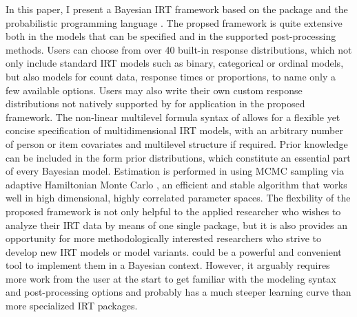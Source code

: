 \documentclass[jss]{jss}
\begin{document}
In this paper, I present a Bayesian IRT framework based on the
 package  \citep{brms1, brms2} and the
probabilistic programming language 
\citep{carpenter2017}. The propsed framework is quite extensive both in
the models that can be specified and in the supported post-processing
methods. Users can choose from over 40 built-in response distributions,
which not only include standard IRT models such as binary, categorical
or ordinal models, but also models for count data, response times or
proportions, to name only a few available options. Users may also write
their own custom response distributions not natively supported by
 for application in the proposed framework. The non-linear
multilevel formula syntax of  allows for a flexible yet
concise specification of multidimensional IRT models, with an arbitrary
number of person or item covariates and multilevel structure if
required. Prior knowledge can be included in the form prior
distributions, which constitute an essential part of every Bayesian
model. Estimation is performed in  using MCMC sampling
via adaptive Hamiltonian Monte Carlo \citep{hoffman2014, stanM2019}, an
efficient and stable algorithm that works well in high dimensional,
highly correlated parameter spaces. The flexbility of the proposed
framework is not only helpful to the applied researcher who wishes to
analyze their IRT data by means of one single package, but it is also
provides an opportunity for more methodologically interested researchers
who strive to develop new IRT models or model variants.  could
be a powerful and convenient tool to implement them in a Bayesian
context. However, it arguably requires more work from the user at the
start to get familiar with the modeling syntax and post-processing
options and probably has a much steeper learning curve than more
specialized IRT packages.
\end{document}
